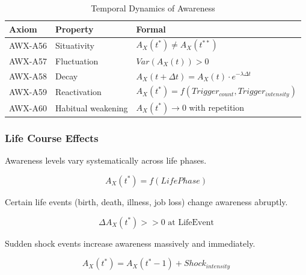 \begin{table}[htbp]
\centering
\caption{Temporal Dynamics of Awareness}
\label{tab:temporal-dynamics}
\renewcommand{\arraystretch}{1.3}
\begin{tabular}{@{}lll@{}}
\toprule
\textbf{Axiom} & \textbf{Property} & \textbf{Formal} \\
\midrule
AWX-A56 & Situativity & $A_X(t^*) \neq A_X(t^{**})$ \\
AWX-A57 & Fluctuation & $Var(A_X(t)) > 0$ \\
AWX-A58 & Decay & $A_X(t + \Delta t) = A_X(t) \cdot e^{-\lambda \Delta t}$ \\
AWX-A59 & Reactivation & $A_X(t^*) = f(Trigger_{count}, Trigger_{intensity})$ \\
AWX-A60 & Habitual weakening & $A_X(t^*) \rightarrow 0$ with repetition \\
\bottomrule
\end{tabular}
\end{table}

\subsubsection{Life Course Effects}

\begin{axiom}
\label{ax:awx-a61}
Awareness levels vary systematically across life phases.
\end{axiom}

\begin{equation}
A_X(t^*) = f(LifePhase)
\end{equation}

\begin{axiom}
\label{ax:awx-a62}
Certain life events (birth, death, illness, job loss) change awareness abruptly.
\end{axiom}

\begin{equation}
\Delta A_X(t^*) >> 0 \text{ at LifeEvent}
\end{equation}

\begin{axiom}
\label{ax:awx-a63}
Sudden shock events increase awareness massively and immediately.
\end{axiom}

\begin{equation}
A_X(t^*) = A_X(t^*-1) + Shock_{intensity}
\end{equation}

